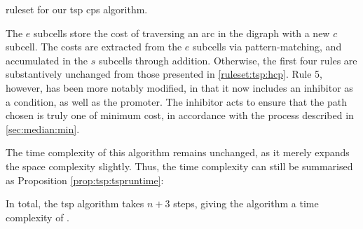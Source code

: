 \begin{cprulesetfloat}
    \begin{cpruleset}
        
        
        
        
        
        
    \end{cpruleset}
    \caption[\Gls{ruleset} for the ]{\label{ruleset:tsp:tsp}\Gls{ruleset} for our \gls{tsp} \gls{cps} algorithm.}
\end{cprulesetfloat}

The \(e\) subcells store the cost of traversing an arc in the digraph with a new \(c\) subcell.  The costs are extracted from the \(e\) subcells via pattern-matching, and accumulated in the \(s\) subcells through addition.  Otherwise, the first four rules are substantively unchanged from those presented in \cref{ruleset:tsp:hcp}.  Rule 5, however, has been more notably modified, in that it now includes an inhibitor as a condition, as well as the promoter.  The inhibitor acts to ensure that the path chosen is truly one of minimum cost, in accordance with the process described in \cref{sec:median:min}.

The time complexity of this algorithm remains unchanged, as it merely expands the space complexity slightly.  Thus, the time complexity can still be summarised as Proposition \ref{prop:tsp:tspruntime}:

\begin{proposition}
In total, the \gls{tsp} algorithm takes \(n + 3\) steps, giving the algorithm a time complexity of .
\label{prop:tsp:tspruntime}
\end{proposition}